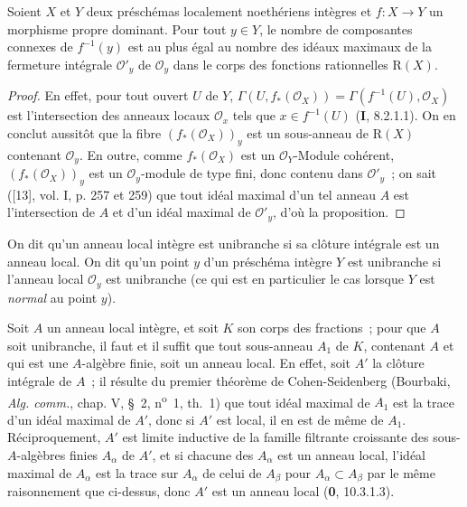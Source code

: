 \begin{proposition}[4.3.5]
\label{III.4.3.5-fr}
Soient $X$ et $Y$ deux préschémas localement noethériens intègres et
$f:X\to Y$ un morphisme propre dominant. Pour tout $y\in Y$, le nombre de
composantes connexes de $f^{-1}(y)$ est au plus égal au nombre des idéaux
maximaux de la fermeture intégrale $\mathcal O'_y$ de $\mathcal O_y$ dans le
corps des fonctions rationnelles $\mathrm R(X)$.
\end{proposition}

\begin{proof}
En effet, pour tout ouvert $U$ de $Y$,
$\Gamma(U,f_*(\mathcal O_X))=\Gamma(f^{-1}(U),\mathcal O_X)$
est l'intersection des anneaux locaux $\mathcal O_x$ tels que
$x\in f^{-1}(U)$ (\textbf{I}, 8.2.1.1). On en conclut aussitôt que la fibre
$(f_*(\mathcal O_X))_y$ est un sous-anneau de $\mathrm R(X)$ contenant
$\mathcal O_y$. En outre, comme $f_*(\mathcal O_X)$ est un
$\mathcal O_Y$-Module cohérent, $(f_*(\mathcal O_X))_y$ est un
$\mathcal O_y$-module de type fini, donc contenu dans $\mathcal O'_y$~; on
sait ([13], vol. I, p. 257 et 259) que tout idéal maximal d'un tel anneau
$A$ est l'intersection de $A$ et d'un idéal maximal de $\mathcal O'_y$,
d'où la proposition.
\end{proof}

\begin{definition}[4.3.6]
\label{III.4.3.6-fr}
On dit qu'un anneau local intègre est unibranche si sa clôture
intégrale est un anneau local. On dit qu'un point $y$ d'un préschéma intègre
$Y$ est unibranche si l'anneau local $\mathcal O_y$ est unibranche \textup{(ce qui
est en particulier le cas lorsque $Y$ est \emph{normal} au point $y$)}.
\end{definition}

Soit $A$ un anneau local intègre, et soit $K$ son corps des fractions~; pour
que $A$ soit unibranche, il faut et il suffit que tout sous-anneau $A_1$ de
$K$, contenant $A$ et qui est une $A$-algèbre finie, soit un anneau local.
En effet, soit $A'$ la clôture intégrale de $A$~; il résulte du premier
théorème de Cohen-Seidenberg (Bourbaki, \emph{Alg. comm.}, chap. V, \S~2,
n\textsuperscript{o}~1, th.~1) que tout idéal maximal de $A_1$ est la trace
d'un idéal maximal de $A'$, donc si $A'$ est local, il en est de même de
$A_1$. Réciproquement, $A'$ est limite inductive
de la famille filtrante croissante des sous-$A$-algèbres finies $A_\alpha$
de $A'$, et si chacune des $A_\alpha$ est un anneau local, l'idéal maximal
de $A_\alpha$ est la trace sur $A_\alpha$ de celui de $A_\beta$ pour
$A_\alpha\subset A_\beta$ par le même raisonnement que ci-dessus, donc $A'$
est un anneau local (\textbf{0}, 10.3.1.3).

